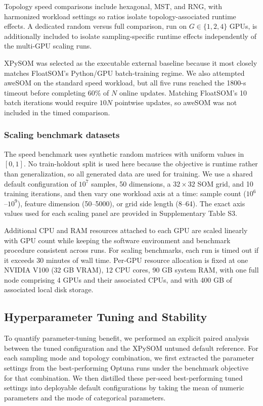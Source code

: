 \documentclass[10pt]{article} %
\begin{document}
Topology speed comparisons include hexagonal, MST, and RNG, with harmonized workload settings so ratios isolate topology-associated runtime effects. A dedicated random versus full comparison, run on $G\in\{1,2,4\}$ GPUs, is additionally included to isolate sampling-specific runtime effects independently of the multi-GPU scaling runs.

XPySOM was selected as the executable external baseline because it most closely matches FloatSOM's Python/GPU batch-training regime. We also attempted aweSOM on the standard speed workload, but all five runs reached the 1800-s timeout before completing 60\% of $N$ online updates. Matching FloatSOM's 10 batch iterations would require $10N$ pointwise updates, so aweSOM was not included in the timed comparison.

\subsubsection{Scaling benchmark datasets}

The speed benchmark uses synthetic random matrices with uniform values in $[0,1]$. No train-holdout split is used here because the objective is runtime rather than generalization, so all generated data are used for training. We use a shared default configuration of $10^7$ samples, 50 dimensions, a $32 \times 32$ SOM grid, and 10 training iterations, and then vary one workload axis at a time: sample count ($10^6$--$10^9$), feature dimension (50--5000), or grid side length (8--64). The exact axis values used for each scaling panel are provided in Supplementary Table S3.

Additional CPU and RAM resources attached to each GPU are scaled linearly with GPU count while keeping the software environment and benchmark procedure consistent across runs. For scaling benchmarks, each run is timed out if it exceeds 30 minutes of wall time. Per-GPU resource allocation is fixed at one NVIDIA V100 (32 GB VRAM), 12 CPU cores, 90 GB system RAM, with one full node comprising 4 GPUs and their associated CPUs, and with 400 GB of associated local disk storage.

\subsection{Hyperparameter Tuning and Stability}

To quantify parameter-tuning benefit, we performed an explicit paired analysis between the tuned configuration and the XPySOM untuned default reference. For each sampling mode and topology combination, we first extracted the parameter settings from the best-performing Optuna runs under the benchmark objective for that combination. We then distilled these per-seed best-performing tuned settings into deployable default configurations by taking the mean of numeric parameters and the mode of categorical parameters.
\end{document}
